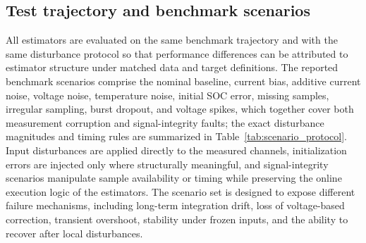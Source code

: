 \documentclass[review,nopreprintline]{elsarticle}
\begin{document}
\subsection{Test trajectory and benchmark scenarios}
All estimators are evaluated on the same benchmark trajectory and with the same disturbance protocol so that performance differences can be attributed to estimator structure under matched data and target definitions. The reported benchmark scenarios comprise the nominal baseline, current bias, additive current noise, voltage noise, temperature noise, initial SOC error, missing samples, irregular sampling, burst dropout, and voltage spikes, which together cover both measurement corruption and signal-integrity faults; the exact disturbance magnitudes and timing rules are summarized in Table~\ref{tab:scenario_protocol}. Input disturbances are applied directly to the measured channels, initialization errors are injected only where structurally meaningful, and signal-integrity scenarios manipulate sample availability or timing while preserving the online execution logic of the estimators. The scenario set is designed to expose different failure mechanisms, including long-term integration drift, loss of voltage-based correction, transient overshoot, stability under frozen inputs, and the ability to recover after local disturbances.
\end{document}
